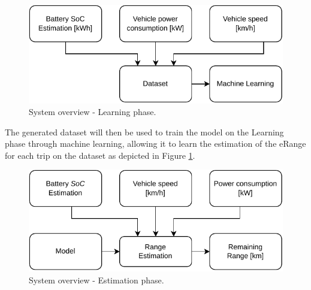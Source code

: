 \begin{figure}[H]
    \begin{center}
        \includegraphics[scale=1.0]{../figures/generic_diagram_learn_phase}
        \caption{System overview - Learning phase.}
        \label{fig:generic_diagram_learn_phase}
    \end{center}
\end{figure}

The generated \gls{dataset} will then be used to train
the model on the Learning phase through machine learning, 
allowing it to learn the estimation of 
the \gls{eRange} for each trip on the \gls{dataset}
as depicted in Figure \ref{fig:generic_diagram_learn_phase}.


\begin{figure}[H]
    \begin{center}
        \includegraphics[scale=1.0]{../figures/generic_diagram_estimation_phase}
        \caption{System overview - Estimation phase.}
        \label{fig:generic_diagram_estimation_phase}
    \end{center}
\end{figure}

